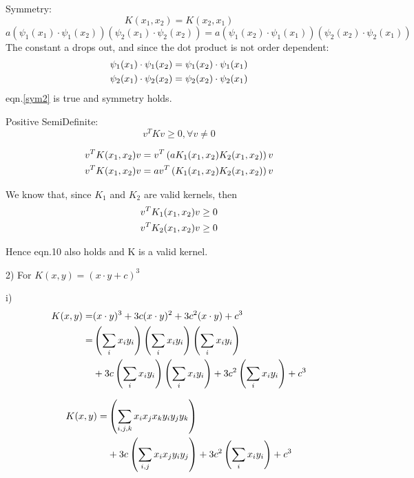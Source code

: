 \documentclass[12pt]{article}
\begin{document}
Symmetry: 
\begin{equation}
    K(x_1,x_2) = K(x_2,x_1)
\end{equation}
\begin{equation}
    a\left(\psi_1(x_1)\cdot\psi_1(x_2)\right)\left(\psi_2(x_1)\cdot\psi_2(x_2)\right) 
    = a\left(\psi_1(x_2)\cdot\psi_1(x_1)\right)\left(\psi_2(x_2)\cdot\psi_2(x_1)\right)
    \label{sym2}
\end{equation}
The constant a drops out, and since the dot product is not order dependent: 
\begin{align}
    \psi_1(x_1)\cdot\psi_1(x_2) = \psi_1(x_2)\cdot\psi_1(x_1) \notag \\
    \psi_2(x_1)\cdot\psi_2(x_2) = \psi_2(x_2)\cdot\psi_2(x_1)
\end{align}
eqn.\ref{sym2} is true and symmetry holds. 

Positive SemiDefinite: 
\begin{equation}
    v^T K v \geq 0, \forall v\neq 0
\end{equation}

\begin{align}
    v^T K(x_1,x_2) v &= v^T \left( aK_1(x_1,x_2)K_2(x_1,x_2) \right) v \notag \\
    v^T K(x_1,x_2) v &= av^T \left( K_1(x_1,x_2)K_2(x_1,x_2) \right) v 
\end{align}

We know that, since $K_1$ and $K_2$ are valid kernels, then 
\begin{align}
    v^T K_1(x_1,x_2) v \geq 0 \notag \\
    v^T K_2(x_1,x_2) v \geq 0 
\end{align}

Hence eqn.10 also holds and K is a valid kernel. 

\pagebreak
\setcounter{equation}{0}
2) For $K(x,y) = (x\cdot y + c)^3$

i)  
\begin{align}
   K(x,y) =& (x \cdot y)^3  + 3c(x \cdot y)^2 + 3c^2(x \cdot y) + c^3 \notag \\
   =& \left(\sum_i x_iy_i\right)\left(\sum_i x_iy_i\right)\left(\sum_i x_iy_i\right) \notag \\
   &+ 3c\left(\sum_i x_iy_i\right)\left(\sum_i x_iy_i\right) + 3c^2\left(\sum_i x_iy_i\right) + c^3
\end{align}

\begin{align}
   K(x,y) =& \left(\sum_{i,j,k} x_ix_jx_ky_iy_jy_k\right) \notag \\
   &+ 3c\left(\sum_{i,j} x_ix_jy_iy_j\right) + 3c^2\left(\sum_i x_iy_i\right) + c^3
\end{align}
\end{document}
